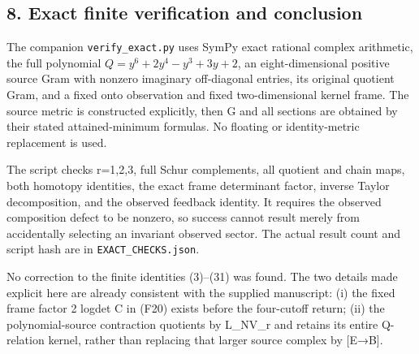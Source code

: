 \subsection{8. Exact finite verification and conclusion}\label{exact-finite-verification-and-conclusion}

The companion \texttt{verify\_exact.py} uses SymPy exact rational complex arithmetic, the full polynomial \(Q=y^6+2y^4-y^3+3y+2\), an eight-dimensional positive source Gram with nonzero imaginary off-diagonal entries, its original quotient Gram, and a fixed onto observation and fixed two-dimensional kernel frame. The source metric is constructed explicitly, then G and all sections are obtained by their stated attained-minimum formulas. No floating or identity-metric replacement is used.

The script checks r=1,2,3, full Schur complements, all quotient and chain maps, both homotopy identities, the exact frame determinant factor, inverse Taylor decomposition, and the observed feedback identity. It requires the observed composition defect to be nonzero, so success cannot result merely from accidentally selecting an invariant observed sector. The actual result count and script hash are in \nolinkurl{EXACT_CHECKS.json}.

No correction to the finite identities (3)--(31) was found. The two details made explicit here are already consistent with the supplied manuscript: (i) the fixed frame factor 2 log\textbar det C\textbar{} in (F20) exists before the four-cutoff return; (ii) the polynomial-source contraction quotients by L\_NV\_r and retains its entire Q-relation kernel, rather than replacing that larger source complex by {[}E→B{]}.
